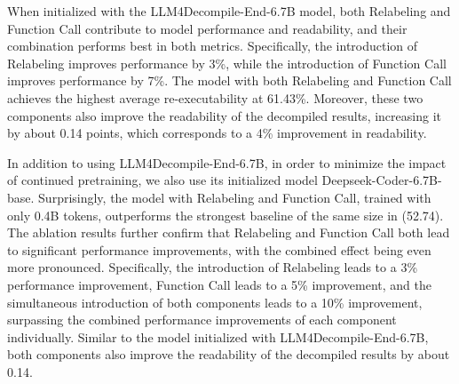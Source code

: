 When initialized with the LLM4Decompile-End-6.7B model, both Relabeling and Function Call contribute to model performance and readability, and their combination performs best in both metrics.
Specifically, the introduction of Relabeling improves performance by 3\%, while the introduction of Function Call improves performance by 7\%. The model with both Relabeling and Function Call achieves the highest average re-executability at 61.43\%. Moreover, these two components also improve the readability of the decompiled results, increasing it by about 0.14 points, which corresponds to a 4\% improvement in readability.

In addition to using LLM4Decompile-End-6.7B, in order to minimize the impact of continued pretraining, we also use its initialized model Deepseek-Coder-6.7B-base. Surprisingly, the model with Relabeling and Function Call, trained with only 0.4B tokens, outperforms the strongest baseline of the same size in  (52.74). The ablation results further confirm that Relabeling and Function Call both lead to significant performance improvements, with the combined effect being even more pronounced. Specifically, the introduction of Relabeling leads to a 3\% performance improvement, Function Call leads to a 5\% improvement, and the simultaneous introduction of both components leads to a 10\% improvement, surpassing the combined performance improvements of each component individually. Similar to the model initialized with LLM4Decompile-End-6.7B, both components also improve the readability of the decompiled results by about 0.14.




